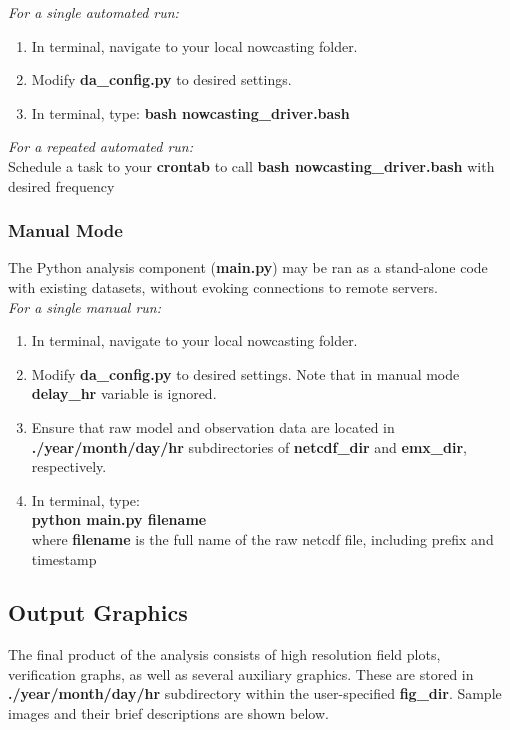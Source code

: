 \documentclass{article}
\begin{document}
\noindent \emph{For a single automated run:} 
\begin{enumerate}[1.]
\item In terminal, navigate to your local nowcasting folder. 
\item Modify \textbf{da\_config.py} to desired settings.
\item In terminal, type: \textbf{bash nowcasting\_driver.bash}\\
\end{enumerate}
\noindent \emph{For a repeated automated run:} \\
\noindent Schedule a task to your \textbf{crontab} to call  \textbf{bash nowcasting\_driver.bash} with desired frequency\\

\subsubsection{Manual Mode}
The Python analysis component (\textbf{main.py}) may be ran as a stand-alone code with existing datasets, without evoking connections to remote servers. \\

\noindent \emph{For a single manual run:} \\
\begin{enumerate}[1.]
\item In terminal, navigate to your local nowcasting folder. 
\item Modify \textbf{da\_config.py} to desired settings. Note that in manual mode \textbf{delay\_hr} variable is ignored. 
\item Ensure that raw model and observation data are located in \textbf{./year/month/day/hr} subdirectories of \textbf{netcdf\_dir} and \textbf{emx\_dir}, respectively.
\item In terminal, type: \\
\textbf{python main.py filename}\\
 where \textbf{filename} is the full name of the raw netcdf file, including prefix and timestamp
\end{enumerate}

\subsection{Output Graphics}
\FloatBarrier
The final product of the analysis consists of high resolution field plots, verification graphs, as well as several auxiliary graphics. These are stored in  \textbf{./year/month/day/hr} subdirectory within the user-specified \textbf{fig\_dir}. Sample images and their brief descriptions are shown below. 
\end{document}
